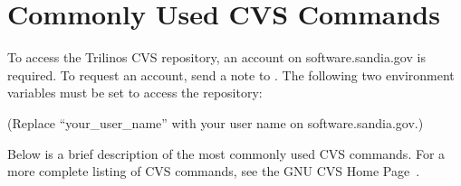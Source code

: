 \documentclass[12pt,relax]{TrilinosDevGuide}
\begin{document}
\appendix
\section{Commonly Used CVS Commands}
\label{Section:CVS}
To access the Trilinos CVS repository, an account on software.sandia.gov is 
required.  To request an account, send a note to 
.  
The following two 
environment variables must be set to access the repository:


(Replace ``your\_user\_name'' with your user name on software.sandia.gov.)

Below is a brief description of the most commonly used CVS commands.  For a 
more complete listing of CVS commands, see the GNU CVS Home Page~\cite{CVS}.
\end{document}
